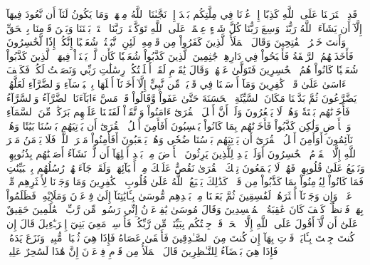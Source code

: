 قَدِ ٱفۡتَرَيۡنَا عَلَى ٱللَّهِ كَذِبًا إِنۡ عُدۡنَا فِي مِلَّتِكُم بَعۡدَ إِذۡ نَجَّىٰنَا ٱللَّهُ مِنۡهَاۚ وَمَا يَكُونُ لَنَآ أَن نَّعُودَ فِيهَآ إِلَّآ أَن يَشَآءَ ٱللَّهُ رَبُّنَاۚ وَسِعَ رَبُّنَا كُلَّ شَيۡءٍ عِلۡمًاۚ عَلَى ٱللَّهِ تَوَكَّلۡنَاۚ رَبَّنَا ٱفۡتَحۡ بَيۡنَنَا وَبَيۡنَ قَوۡمِنَا بِٱلۡحَقِّ وَأَنتَ خَيۡرُ ٱلۡفَٰتِحِينَ
وَقَالَ ٱلۡمَلَأُ ٱلَّذِينَ كَفَرُواْ مِن قَوۡمِهِۦ لَئِنِ ٱتَّبَعۡتُمۡ شُعَيۡبًا إِنَّكُمۡ إِذٗا لَّخَٰسِرُونَ
فَأَخَذَتۡهُمُ ٱلرَّجۡفَةُ فَأَصۡبَحُواْ فِي دَارِهِمۡ جَٰثِمِينَ
ٱلَّذِينَ كَذَّبُواْ شُعَيۡبٗا كَأَن لَّمۡ يَغۡنَوۡاْ فِيهَاۚ ٱلَّذِينَ كَذَّبُواْ شُعَيۡبٗا كَانُواْ هُمُ ٱلۡخَٰسِرِينَ
فَتَوَلَّىٰ عَنۡهُمۡ وَقَالَ يَٰقَوۡمِ لَقَدۡ أَبۡلَغۡتُكُمۡ رِسَٰلَٰتِ رَبِّي وَنَصَحۡتُ لَكُمۡۖ فَكَيۡفَ ءَاسَىٰ عَلَىٰ قَوۡمٖ كَٰفِرِينَ
وَمَآ أَرۡسَلۡنَا فِي قَرۡيَةٖ مِّن نَّبِيٍّ إِلَّآ أَخَذۡنَآ أَهۡلَهَا بِٱلۡبَأۡسَآءِ وَٱلضَّرَّآءِ لَعَلَّهُمۡ يَضَّرَّعُونَ
ثُمَّ بَدَّلۡنَا مَكَانَ ٱلسَّيِّئَةِ ٱلۡحَسَنَةَ حَتَّىٰ عَفَواْ وَّقَالُواْ قَدۡ مَسَّ ءَابَآءَنَا ٱلضَّرَّآءُ وَٱلسَّرَّآءُ فَأَخَذۡنَٰهُم بَغۡتَةٗ وَهُمۡ لَا يَشۡعُرُونَ
وَلَوۡ أَنَّ أَهۡلَ ٱلۡقُرَىٰٓ ءَامَنُواْ وَٱتَّقَوۡاْ لَفَتَحۡنَا عَلَيۡهِم بَرَكَٰتٖ مِّنَ ٱلسَّمَآءِ وَٱلۡأَرۡضِ وَلَٰكِن كَذَّبُواْ فَأَخَذۡنَٰهُم بِمَا كَانُواْ يَكۡسِبُونَ
أَفَأَمِنَ أَهۡلُ ٱلۡقُرَىٰٓ أَن يَأۡتِيَهُم بَأۡسُنَا بَيَٰتٗا وَهُمۡ نَآئِمُونَ
أَوَأَمِنَ أَهۡلُ ٱلۡقُرَىٰٓ أَن يَأۡتِيَهُم بَأۡسُنَا ضُحٗى وَهُمۡ يَلۡعَبُونَ
أَفَأَمِنُواْ مَكۡرَ ٱللَّهِۚ فَلَا يَأۡمَنُ مَكۡرَ ٱللَّهِ إِلَّا ٱلۡقَوۡمُ ٱلۡخَٰسِرُونَ
أَوَلَمۡ يَهۡدِ لِلَّذِينَ يَرِثُونَ ٱلۡأَرۡضَ مِنۢ بَعۡدِ أَهۡلِهَآ أَن لَّوۡ نَشَآءُ أَصَبۡنَٰهُم بِذُنُوبِهِمۡۚ وَنَطۡبَعُ عَلَىٰ قُلُوبِهِمۡ فَهُمۡ لَا يَسۡمَعُونَ
تِلۡكَ ٱلۡقُرَىٰ نَقُصُّ عَلَيۡكَ مِنۡ أَنۢبَآئِهَاۚ وَلَقَدۡ جَآءَتۡهُمۡ رُسُلُهُم بِٱلۡبَيِّنَٰتِ فَمَا كَانُواْ لِيُؤۡمِنُواْ بِمَا كَذَّبُواْ مِن قَبۡلُۚ كَذَٰلِكَ يَطۡبَعُ ٱللَّهُ عَلَىٰ قُلُوبِ ٱلۡكَٰفِرِينَ
وَمَا وَجَدۡنَا لِأَكۡثَرِهِم مِّنۡ عَهۡدٖۖ وَإِن وَجَدۡنَآ أَكۡثَرَهُمۡ لَفَٰسِقِينَ
ثُمَّ بَعَثۡنَا مِنۢ بَعۡدِهِم مُّوسَىٰ بِـَٔايَٰتِنَآ إِلَىٰ فِرۡعَوۡنَ وَمَلَإِيْهِۦ فَظَلَمُواْ بِهَاۖ فَٱنظُرۡ كَيۡفَ كَانَ عَٰقِبَةُ ٱلۡمُفۡسِدِينَ
وَقَالَ مُوسَىٰ يَٰفِرۡعَوۡنُ إِنِّي رَسُولٞ مِّن رَّبِّ ٱلۡعَٰلَمِينَ
حَقِيقٌ عَلَىٰٓ أَن لَّآ أَقُولَ عَلَى ٱللَّهِ إِلَّا ٱلۡحَقَّۚ قَدۡ جِئۡتُكُم بِبَيِّنَةٖ مِّن رَّبِّكُمۡ فَأَرۡسِلۡ مَعِيَ بَنِيٓ إِسۡرَـٰٓءِيلَ
قَالَ إِن كُنتَ جِئۡتَ بِـَٔايَةٖ فَأۡتِ بِهَآ إِن كُنتَ مِنَ ٱلصَّـٰدِقِينَ
فَأَلۡقَىٰ عَصَاهُ فَإِذَا هِيَ ثُعۡبَانٞ مُّبِينٞ
وَنَزَعَ يَدَهُۥ فَإِذَا هِيَ بَيۡضَآءُ لِلنَّـٰظِرِينَ
قَالَ ٱلۡمَلَأُ مِن قَوۡمِ فِرۡعَوۡنَ إِنَّ هَٰذَا لَسَٰحِرٌ عَلِيمٞ
